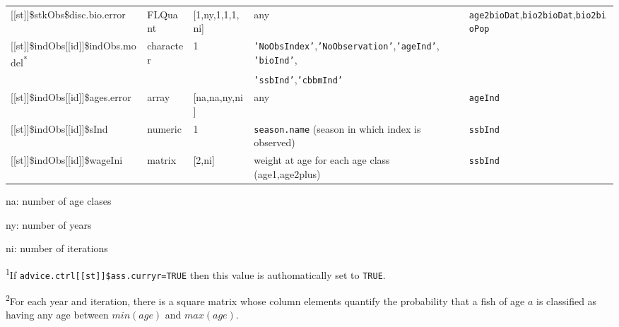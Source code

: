 \begin{landscape}
\begin{table}[!ht]
\begin{footnotesize}
\begin{threeparttable}
\begin{tabular}{lllll}
        {[[st]]}\$stkObs\$disc.bio.error & FLQuant & [1,ny,1,1,1,ni] & any & \texttt{age2bioDat},\texttt{bio2bioDat},\texttt{bio2bioPop} \\
        {[[st]]}\$indObs[[id]]\$indObs.model\textsuperscript{*} & character & 1 & \texttt{'NoObsIndex'},\texttt{'NoObservation'},\texttt{'ageInd'},
          \texttt{'bioInd'}, &  \\
         &  &  & \texttt{'ssbInd'},\texttt{'cbbmInd'} &  \\ %
        {[[st]]}\$indObs[[id]]\$ages.error & array & [na,na,ny,ni] & any & \texttt{ageInd} \\
        {[[st]]}\$indObs[[id]]\$sInd & numeric & 1 & \texttt{season.name} (season in which index is observed) & \texttt{ssbInd} \\
        {[[st]]}\$indObs[[id]]\$wageIni & matrix & [2,ni] & weight at age for each age class (age1,age2plus) & \texttt{ssbInd} \\
        \hline
      \end{tabular}

      \begin{tablenotes}
        \item na: number of age clases
        \item ny: number of years
        \item ni: number of iterations
        \item \textsuperscript{1}If \texttt{advice.ctrl[[st]]\$ass.curryr=TRUE} then this value is authomatically set to \texttt{TRUE}.
        \item \textsuperscript{2}For each year and iteration, there is a square matrix
          whose column elements quantify the probability that a fish of age $a$ is classified as having any age between
          $min(age)$ and $max(age)$.
      \end{tablenotes}

    \end{threeparttable}
  \end{footnotesize}

\end{table}
	

\begin{table}[!ht]

  \centering
  \begin{footnotesize}


\end{footnotesize}
\end{table}
\end{landscape}
